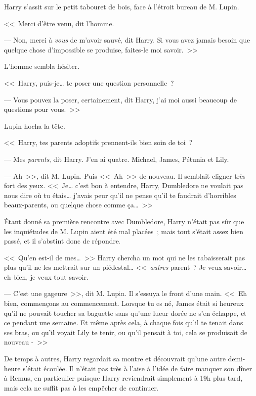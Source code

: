 Harry s'assit sur le petit tabouret de bois, face à l'étroit bureau de M. Lupin.

<<~Merci d'être venu, dit l'homme.

--- Non, merci à \emph{vous} de m'avoir sauvé, dit Harry. Si vous avez jamais besoin que quelque chose d'impossible se produise, faites-le moi savoir.~>>

L'homme sembla hésiter.

<<~Harry, puis-je… te poser une question personnelle~?

--- Vous pouvez la poser, certainement, dit Harry, j'ai moi aussi beaucoup de questions pour vous.~>>

Lupin hocha la tête.

<<~Harry, tes parents adoptifs prennent-ils bien soin de toi~?

--- Mes \emph{parents}, dit Harry. J'en ai quatre. Michael, James, Pétunia et Lily.

--- Ah~>>, dit M. Lupin. Puis <<~Ah~>> de nouveau. Il semblait cligner très fort des yeux. <<~Je… c'est bon à entendre, Harry, Dumbledore ne voulait pas nous dire où tu étais… j'avais peur qu'il ne pense qu'il te faudrait d'horribles beaux-parents, ou quelque chose comme ça…~>>

Étant donné sa première rencontre avec Dumbledore, Harry n'était pas sûr que les inquiétudes de M. Lupin aient été mal placées~; mais tout s'était assez bien passé, et il s'abstint donc de répondre.

<<~Qu'en est-il de mes…~>> Harry chercha un mot qui ne les rabaisserait pas plus qu'il ne les mettrait sur un piédestal… <<~\emph{autres} parent~? Je veux savoir… eh bien, je veux tout savoir.

--- C'est une gageure~>>, dit M. Lupin. Il s'essuya le front d'une main. <<~Eh bien, commençons au commencement. Lorsque tu es né, James était si heureux qu'il ne pouvait toucher sa baguette sans qu'une lueur dorée ne s'en échappe, et ce pendant une semaine. Et même après cela, à chaque fois qu'il te tenait dans ses bras, ou qu'il voyait Lily te tenir, ou qu'il pensait à toi, cela se produisait de nouveau -~>>

\later

De temps à autres, Harry regardait sa montre et découvrait qu'une autre demi-heure s'était écoulée. Il n'était pas très à l'aise à l'idée de faire manquer son dîner à Remus, en particulier puisque Harry reviendrait simplement à 19h plus tard, mais cela ne suffit pas à les empêcher de continuer.

